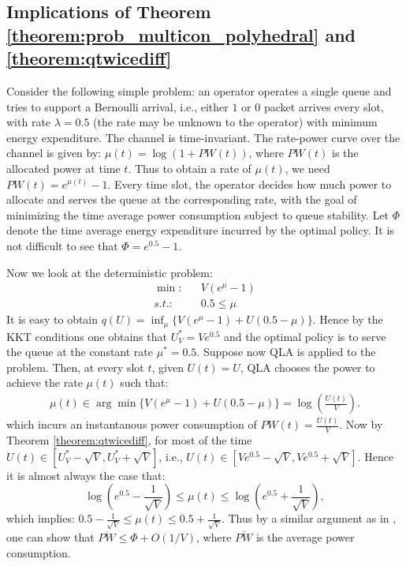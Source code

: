 \documentclass[journal]{IEEEtran}
\begin{document}

\subsection{Implications of Theorem \ref{theorem:prob_multicon_polyhedral} and \ref{theorem:qtwicediff}}

Consider the following simple problem: an operator operates a single queue and tries to support a Bernoulli arrival, i.e., either $1$ or $0$ packet arrives every slot, with rate $\lambda=0.5$ (the rate may be unknown to the operator) with minimum energy expenditure. The channel is time-invariant. The rate-power curve over the channel is given by: $\mu(t)=\log(1+PW(t))$, where $PW(t)$ is the allocated power at time $t$. Thus to obtain a rate of $\mu(t)$, we need $PW(t)=e^{\mu(t)}-1$. Every time slot, the operator decides how much power to allocate and serves the queue at the corresponding rate, with the goal of minimizing the time average power consumption subject to queue stability. Let $\Phi$ denote the time average energy expenditure incurred by the optimal policy. It is not difficult to see that $\Phi=e^{0.5}-1$. 

Now we look at the deterministic problem:
\begin{eqnarray*}
\min:&& V(e^{\mu}-1)\\
s.t.: && 0.5\leq\mu
\end{eqnarray*}
It is easy to obtain $q(U)=\inf_{\mu}\big\{V(e^{\mu}-1)+U(0.5-\mu)\big\}$. Hence by the KKT conditions \cite{bertsekasoptbook} one obtains that  $U_V^*=Ve^{0.5}$ and the optimal policy is to serve the queue at the constant rate $\mu^*=0.5$. Suppose now QLA is applied to the problem. Then, at every slot $t$, given $U(t)=U$, QLA chooses the power to achieve the rate $\mu(t)$ such that: 
\begin{eqnarray}
\mu(t)\in\arg\min \{V(e^{\mu}-1)+U(0.5-\mu)\}=\log(\frac{U(t)}{V}). \label{eq: example_QLA_action}
\end{eqnarray}
which incurs an instantanous power consumption of $PW(t)=\frac{U(t)}{V}$. Now by Theorem \ref{theorem:qtwicediff}, for most of the time $U(t)\in[U^*_V-\sqrt{V}, U^*_V+\sqrt{V}]$, i.e.,  $U(t)\in[Ve^{0.5}-\sqrt{V}, Ve^{0.5}+\sqrt{V}]$. Hence it is almost always the case that:
\[\log(e^{0.5}-\frac{1}{\sqrt{V}})\leq \mu(t)\leq \log(e^{0.5}+\frac{1}{\sqrt{V}}),\]
which implies:
$0.5-\frac{1}{\sqrt{V}}\leq \mu(t)\leq 0.5+\frac{1}{\sqrt{V}}$.
Thus by a similar argument as in \cite{neelyenergydelay}, one can show that $\overline{PW}\leq\Phi+O(1/V)$, where $\overline{PW}$ is the average power consumption. 
\end{document}
